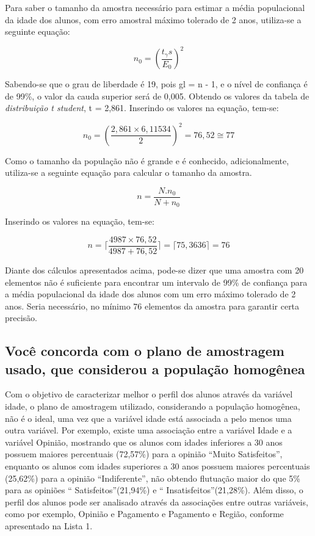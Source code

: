 	Para saber o tamanho da amostra necessário para estimar a média populacional
	da idade dos alunos, com erro amostral máximo tolerado de 2 anos, utiliza-se
	a seguinte equação:

	\begin{equation*}
	  n_0 = \left (\frac{t_\gamma s}{E_0} \right)^2
	\end{equation*}

	Sabendo-se que o grau de liberdade é 19, pois gl = n - 1, e o nível de
	confiança é de 99\%, o valor da cauda superior será de 0,005. Obtendo os
	valores da tabela de \textit{distribuição t student}, t = 2,861. Inserindo
	os valores na equação, tem-se:

	\begin{equation*}
		 n_0 = \left (\frac{2,861 \times 6,11534}{2} \right)^2 = 76,52 \cong 77
	\end{equation*}

	Como o tamanho da população não é grande e é conhecido, adicionalmente,
	utiliza-se a seguinte equação para calcular o tamanho da amostra.

	\begin{equation*}
		 n = \frac{N . n_0}{N + n_0}
	\end{equation*}

	Inserindo os valores na equação, tem-se:

	\begin{equation*}
		 n = \lceil \frac{4987 \times 76,52}{4987 + 76,52} \rceil = \lceil 75,3636 \rceil
		 = 76
	\end{equation*}

	Diante dos cálculos apresentados acima, pode-se dizer que uma amostra
	com 20 elementos não é suficiente para encontrar um intervalo de 99\% de
	confiança para a média populacional da idade dos alunos com um erro
	máximo tolerado de 2 anos. Seria necessário, no mínimo $76$ elementos da
	amostra para garantir certa precisão. 

\subsection{Você concorda com o plano de amostragem usado, que considerou a população homogênea}

	Com o objetivo de caracterizar melhor o perfil dos alunos através da
	variável idade, o plano de amostragem utilizado, considerando a
	população homogênea, não é o ideal, uma vez que a variável idade está
	associada a pelo menos uma outra variável. Por exemplo, existe uma
	associação entre a variável Idade e a variável Opinião, mostrando que os
	alunos com idades inferiores a 30 anos possuem maiores percentuais
	(72,57\%) para a opinião \textquotedblleft Muito
	Satisfeitos\textquotedblright, enquanto os alunos com idades superiores
	a 30 anos possuem maiores percentuais (25,62\%) para a opinião
	\textquotedblleft Indiferente\textquotedblright, não obtendo flutuação
	maior do que 5\% para as opiniões \textquotedblleft
	Satisfeitos\textquotedblright (21,94\%) e \textquotedblleft
	Insatisfeitos\textquotedblright (21,28\%). Além disso, o perfil dos
	alunos pode ser analisado através da associações entre outras variáveis,
	como por exemplo, Opinião e Pagamento e Pagamento e Região, conforme
	apresentado na Lista 1. 

